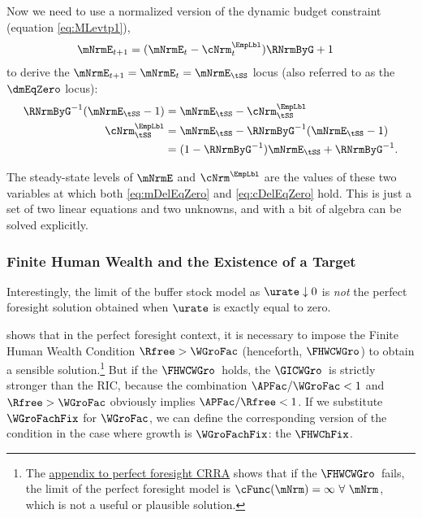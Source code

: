 \documentclass{econark}
\begin{document}
Now we need to use a normalized version of the dynamic budget constraint (equation \eqref{eq:MLevtp1}),
\begin{equation}\begin{gathered}\begin{aligned}
        \mNrmE_{t+1} & =  (\mNrmE_{t}-{\cNrm}^{\EmpLbl}_{t})\RNrmByG+1 \label{eq:metp1}
\end{aligned}\end{gathered}\end{equation}
to derive the $\mNrmE_{t+1}=\mNrmE_{t}=\mNrmE_{\tSS}$ locus (also referred
to as the $\dmEqZero$ locus): 
\begin{equation}\begin{gathered}\begin{aligned}
      \RNrmByG^{-1}(\mNrmE_{\tSS}-1) & =  \mNrmE_{\tSS}-{\cNrm}^{\EmpLbl}_{\tSS}
\\      {\cNrm}^{\EmpLbl}_{\tSS} & =  \mNrmE_{\tSS}-\RNrmByG^{-1}(\mNrmE_{\tSS}-1)
\\       & =  (1-\RNrmByG^{-1})\mNrmE_{\tSS}+\RNrmByG^{-1}. \label{eq:mDelEqZero}
\end{aligned}\end{gathered}\end{equation}

The steady-state levels of $\mNrmE$ and ${\cNrm}^{\EmpLbl}$ are the values of these two variables at which both
\eqref{eq:mDelEqZero} and \eqref{eq:cDelEqZero} hold.  This is
just a set of two linear equations and two unknowns, and with a bit of 
algebra can be solved explicitly.

\subsubsection{Finite Human Wealth and the Existence of a Target}

Interestingly, the limit of the buffer stock model as $\urate \downarrow 0$ is {\it not} the perfect foresight solution obtained when $\urate$ is exactly equal to zero.%

 shows that in the perfect foresight context, it is necessary to impose the Finite Human Wealth Condition $\Rfree > \WGroFac$ (henceforth, $\FHWCWGro$) to obtain a sensible solution.\footnote{The \href{https://llorracc.github.io/PerfForesightCRRA/PerfForesightCRRA-Appendix.pdf}{appendix to perfect foresight CRRA} shows that if the $\FHWCWGro$~fails, the limit of the perfect foresight model is $\cFunc(\mNrm)=\infty~\forall~\mNrm$, which is not a useful or plausible solution.}  But if the $\FHWCWGro$~holds, the $\GICWGro$~is strictly stronger than the RIC, because the combination $\APFac/\WGroFac < 1$ and $\Rfree > \WGroFac$ obviously implies $\APFac/\Rfree < 1$.  If we substitute $\WGroFachFix$ for $\WGroFac$, we can define the corresponding version of the condition in the case where growth is $\WGroFachFix$: the $\FHWChFix$.
\end{document}
